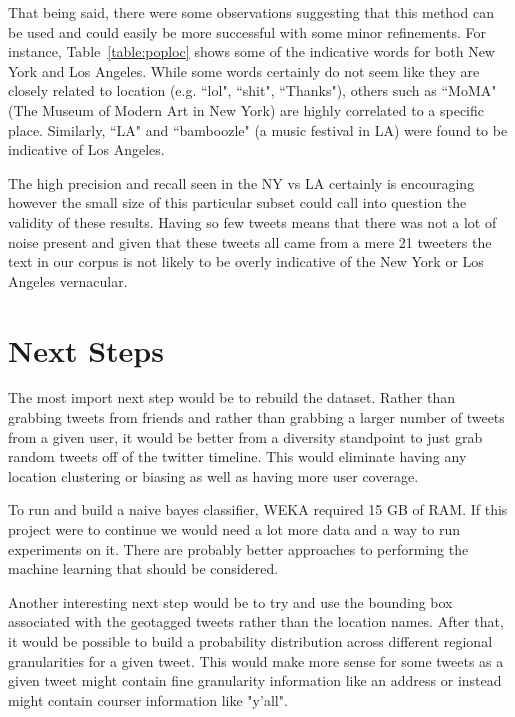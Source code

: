 \documentclass[12pt]{article}
\begin{document}
That being said, there were some observations suggesting that this method can be used and could easily be more successful with some minor refinements.  For instance, Table~\ref{table:poploc} shows some of the indicative words for both New York and Los Angeles.  While some words certainly do not seem like they are closely related to location (e.g. ``lol", ``shit", ``Thanks"), others such as ``MoMA" (The Museum of Modern Art in New York) are highly correlated to a specific place.  Similarly, ``LA" and ``bamboozle" (a music festival in LA) were found to be indicative of Los Angeles.

The high precision and recall seen in the NY vs LA certainly is encouraging however the small size of this particular subset could call into question the validity of these results.  Having so few tweets means that there was not a lot of noise present and given that these tweets all came from a mere 21 tweeters the text in our corpus is not likely to be overly indicative of the New York or Los Angeles vernacular.

\section*{Next Steps}
The most import next step would be to rebuild the dataset.  Rather than grabbing tweets from friends and rather than grabbing a larger number of tweets from a given user, it would be better from a diversity standpoint to just grab random tweets off of the twitter timeline.  This would eliminate having any location clustering or biasing as well as having more user coverage.

To run and build a naive bayes classifier, WEKA required 15 GB of RAM. If this project were to continue we would need a lot more data and a way to run experiments on it. There are probably better approaches to performing the machine learning that should be considered. 

Another interesting next step would be to try and use the bounding box associated with the geotagged tweets rather than the location names.  After that, it would be possible to build a probability distribution across different regional granularities for a given tweet.  This would make more sense for some tweets as a given tweet might contain fine granularity information like an address or instead might contain courser information like "y'all".  



\end{document}
